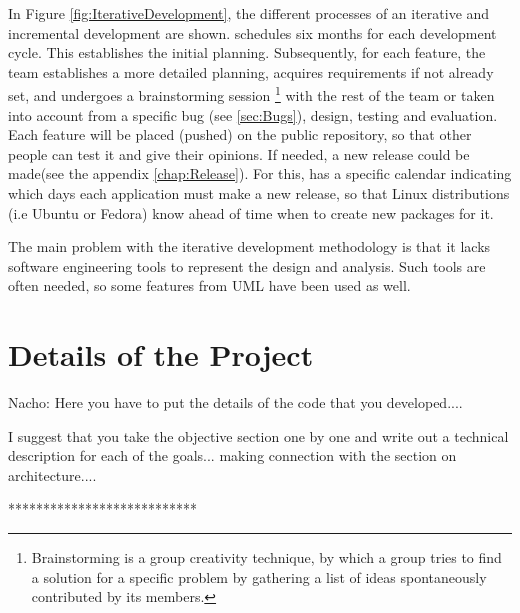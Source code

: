 In Figure \ref{fig:IterativeDevelopment}, the different processes of an iterative and 
incremental development are shown.  \GNOME schedules six months for each development 
cycle. This establishes the initial planning. Subsequently, for each feature, the 
team establishes a more detailed planning, acquires requirements if not already set, 
and undergoes a brainstorming session \footnote{Brainstorming is a group creativity 
technique, by which a group tries to find a solution for a specific problem by gathering 
a list of ideas spontaneously contributed by its members.} with the rest of the team 
or taken into account from a specific bug (see \ref{sec:Bugs}), design, testing and 
evaluation. Each feature will be placed (pushed) on the public repository,  so that 
other people can test it and give their opinions. If needed, a new release could be 
made(see the appendix \ref{chap:Release}).  For this, \GNOME has a specific calendar 
indicating which days each application must make a new release, so that Linux 
distributions (i.e Ubuntu or Fedora) know ahead of time when to create new packages for it.

The main problem with the iterative development methodology is that it lacks software 
engineering tools to represent the design and analysis.  Such tools are often needed, 
so some features from UML have been used as well.


\section{Details of the Project}


Nacho:  Here you have to put the details of the code that you developed....


I suggest that you take the objective section one by one and write out 
a technical description for each of the goals... making connection with the 
section on architecture....


***************************



